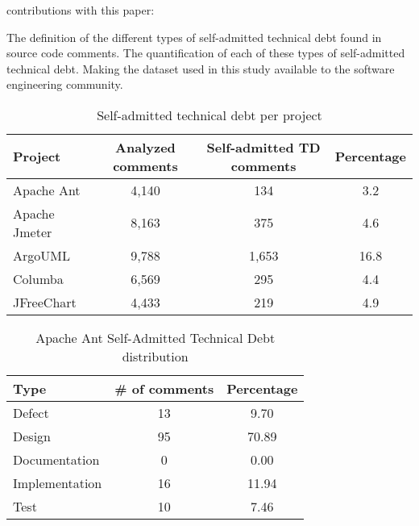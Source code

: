contributions with this paper:

The definition of the different types of self-admitted technical debt found in source code comments.
The quantification of each of these types of self-admitted technical debt.
Making the dataset used in this study available to the software engineering community.  

\begin{table*}[!hbt]
      \begin{center}
            \caption{Self-admitted technical debt per project}
            \label{tab:technical_debt_project}
            \begin{tabular}{l| c c c }
            \toprule
            \textbf{Project}      & \textbf{Analyzed comments}     & \textbf{Self-admitted TD comments} & \textbf{Percentage} \\ \midrule 
              Apache Ant          & 4,140                          & 134                                & 3.2  \\                                   
              Apache Jmeter       & 8,163                          & 375                                & 4.6  \\                                   
              ArgoUML             & 9,788                          & 1,653                              & 16.8 \\                                   
              Columba             & 6,569                          & 295                                & 4.4 \\                                   
              JFreeChart          & 4,433                          & 219                                & 4.9  \\ \bottomrule
            \end{tabular}
      \end{center}
\end{table*}


\begin{table*}[!hbt]
      \begin{center}
            \caption{Apache Ant Self-Admitted Technical Debt distribution}
            \label{tab:ant_td_details}
            \begin{tabular}{l| c c }
            \toprule
            \textbf{Type}   & \textbf{\# of comments}     & \textbf{Percentage}  \\ \midrule 
             Defect          & 13             & 9.70\\     
             Design          & 95             & 70.89\\    
             Documentation   & 0              & 0.00\\      
             Implementation  & 16             & 11.94\\    
             Test            & 10             & 7.46\\  \bottomrule                                   
            \end{tabular}
      \end{center}
\end{table*}

